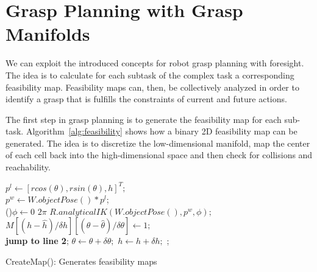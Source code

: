 \documentclass[a4paper,10pt,twocolumn]{article}
\begin{document}
%


\section{Grasp Planning with Grasp Manifolds}
We can exploit the introduced concepts for robot grasp planning
with foresight. The idea is to calculate for each subtask of the
complex task a corresponding feasibility map. Feasibility
maps can, then, be collectively analyzed in order to identify
a grasp that is fulfills the constraints of current and future actions.

The first step in grasp planning is to generate the feasibility
map for each sub-task. Algorithm~\ref{alg:feasibility} shows 
how a binary 2D feasibility map can be generated. The idea is
to discretize the low-dimensional manifold, map the center
of each cell back into the high-dimensional space and then
check for collisions and reachability.   



\begin{algorithm}[ht!]
   {
    \For{$\theta \leftarrow \hat{\theta}$ \KwTo $\check{\theta}$} {
      $p^l \leftarrow [r cos(\theta), r sin(\theta), h]^T;$ \\
      $p^w \leftarrow W.objectPose() * p^l$;  \\
      \For(){$\phi \leftarrow 0$ \KwTo $2 \pi$} {
	$R.analyticalIK(W.objectPose(), p^w, \phi);$ \\
	 {
	  $M[(h-\hat{h})/\delta h][(\theta-\hat{\theta})/\delta \theta] \leftarrow 1;$ \\
	  \textbf{jump to line 2};
	}
      }
      $\theta \leftarrow \theta + \delta \theta;$
    }
    $h \leftarrow h + \delta h;$
  }
  ; 
  \caption{CreateMap(): Generates feasibility maps \label{alg:feasibility}}
\end{algorithm}
\end{document}
